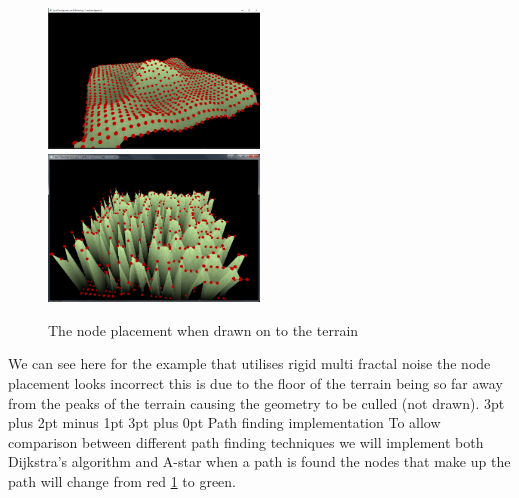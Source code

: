 \documentclass[12pt,a4paper]{article}
\makeatletter
\renewcommand\subsection{\@startsection {subsection}{1}{2mm} %
                               {3pt plus 2pt minus 1pt} %
                               {3pt plus 0pt} %
                               {\normalfont\bfseries}}
\makeatother
\begin{document}
\begin{figure}[ht!]
	\includegraphics[width=0.5\textwidth]{images/nodes}
	\includegraphics[width=0.5\textwidth]{images/RMFnodes}
	\caption{The node placement when drawn on to the terrain} \label{node}
\end{figure}

We can see here for the example that utilises rigid multi fractal noise the node placement looks incorrect this is due to the floor of the terrain being so far away from the peaks of the terrain causing the geometry to be culled (not drawn). 
\subsection{Path finding implementation}
To allow comparison between different path finding techniques we will implement both Dijkstra's algorithm and A-star when a path is found the nodes that make up the path will change from red \ref{node} to green.  
\end{document}
